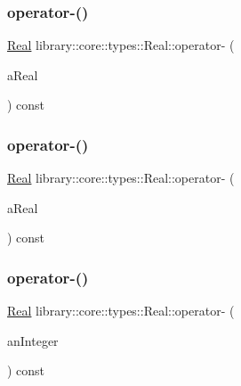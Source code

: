 \subsubsection{\texorpdfstring{operator-\/()}{operator-()}\hspace{0.1cm}{\footnotesize\ttfamily [1/4]}}
{\footnotesize\ttfamily \mbox{\hyperlink{classlibrary_1_1core_1_1types_1_1_real}{Real}} library\+::core\+::types\+::\+Real\+::operator-\/ (\begin{DoxyParamCaption}\item[{const \mbox{\hyperlink{classlibrary_1_1core_1_1types_1_1_real}{Real}} \&}]{a\+Real }\end{DoxyParamCaption}) const}

\mbox{\label{classlibrary_1_1core_1_1types_1_1_real_a45eecda19bb915f419b13c9441b65876}} 
\subsubsection{\texorpdfstring{operator-\/()}{operator-()}\hspace{0.1cm}{\footnotesize\ttfamily [2/4]}}
{\footnotesize\ttfamily \mbox{\hyperlink{classlibrary_1_1core_1_1types_1_1_real}{Real}} library\+::core\+::types\+::\+Real\+::operator-\/ (\begin{DoxyParamCaption}\item[{const \mbox{\hyperlink{classlibrary_1_1core_1_1types_1_1_real_a9c5c8826b7e5a8e39544d23fea6c0e1c}{Real\+::\+Value\+Type}} \&}]{a\+Real }\end{DoxyParamCaption}) const}

\mbox{\label{classlibrary_1_1core_1_1types_1_1_real_acd8b13000f401601c123df6d248a3b7d}} 
\subsubsection{\texorpdfstring{operator-\/()}{operator-()}\hspace{0.1cm}{\footnotesize\ttfamily [3/4]}}
{\footnotesize\ttfamily \mbox{\hyperlink{classlibrary_1_1core_1_1types_1_1_real}{Real}} library\+::core\+::types\+::\+Real\+::operator-\/ (\begin{DoxyParamCaption}\item[{const \mbox{\hyperlink{classlibrary_1_1core_1_1types_1_1_integer}{Integer}} \&}]{an\+Integer }\end{DoxyParamCaption}) const}

